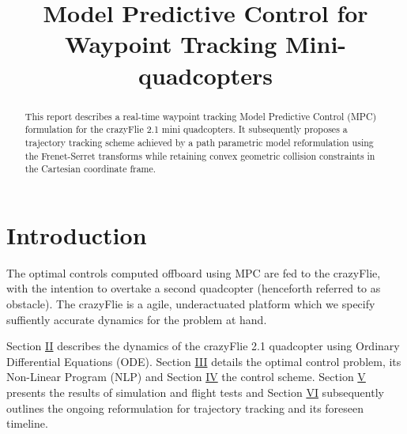 \documentclass[conference]{IEEEtran}
\begin{document}
\title{Model Predictive Control for Waypoint Tracking Mini-quadcopters\\}
\author{
}
\maketitle

\begin{abstract}
This report describes a real-time waypoint tracking Model Predictive Control (MPC) formulation for the crazyFlie 2.1 mini quadcopters. It subsequently proposes a trajectory tracking scheme achieved by a path parametric model reformulation using the Frenet-Serret transforms while retaining convex geometric collision constraints in the Cartesian coordinate frame.

\end{abstract}

\section{Introduction}\label{Introduction}
The optimal controls computed offboard using MPC are fed to the crazyFlie, with the intention to overtake a second quadcopter (henceforth referred to as obstacle). The crazyFlie is a agile, underactuated platform which we specify suffiently accurate dynamics  for the problem at hand.

Section \hyperref[Section2]{II} describes the dynamics of the crazyFlie 2.1 quadcopter using Ordinary Differential Equations (ODE). Section \hyperref[Section3]{III} details the optimal control problem, its Non-Linear Program (NLP) and Section \hyperref[Section4]{IV} the control scheme. Section \hyperref[Section5]{V} presents the results of simulation and flight tests and Section \hyperref[Section6]{VI} subsequently outlines the ongoing reformulation for trajectory tracking and its foreseen timeline. 
\end{document}

